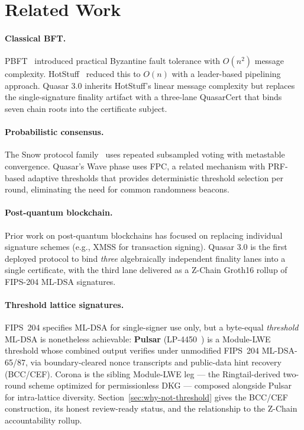 \section{Related Work}

\label{sec:related}

\paragraph{Classical BFT.}
PBFT~\cite{castro1999practical} introduced practical Byzantine fault
tolerance with $O(n^2)$ message complexity. HotStuff~\cite{yin2019hotstuff}
reduced this to $O(n)$ with a leader-based pipelining approach. Quasar
3.0 inherits HotStuff's linear message complexity but replaces the
single-signature finality artifact with a three-lane QuasarCert that
binds seven chain roots into the certificate subject.

\paragraph{Probabilistic consensus.}
The Snow protocol family~\cite{rocket2019scalable} uses repeated
subsampled voting with metastable convergence. Quasar's Wave phase uses
FPC, a related mechanism with PRF-based adaptive thresholds that
provides deterministic threshold selection per round, eliminating the
need for common randomness beacons.

\paragraph{Post-quantum blockchain.}
Prior work on post-quantum blockchains has focused on replacing
individual signature schemes (e.g., XMSS for transaction signing).
Quasar 3.0 is the first deployed protocol to bind \emph{three}
algebraically independent finality lanes into a single certificate, with
the third lane delivered as a Z-Chain Groth16 rollup of FIPS-204 ML-DSA
signatures.

\paragraph{Threshold lattice signatures.}
FIPS~204 specifies ML-DSA for single-signer use only, but a byte-equal
\emph{threshold} ML-DSA is nonetheless achievable: \textbf{Pulsar}
(LP-4450~\cite{lp4450}) is a Module-LWE threshold whose combined output
verifies under unmodified FIPS~204 ML-DSA-65/87, via boundary-cleared
nonce transcripts and public-data hint recovery (BCC/CEF). Corona
\cite{corona} is the sibling Module-LWE leg --- the Ringtail-derived
two-round scheme optimized for permissionless DKG --- composed alongside
Pulsar for intra-lattice diversity. Section~\ref{sec:why-not-threshold}
gives the BCC/CEF construction, its honest review-ready status, and the
relationship to the Z-Chain accountability rollup.

